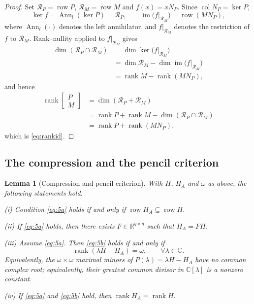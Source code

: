 \documentclass[journal]{IEEEtran}
\theoremstyle{plainn}
\newtheorem{lem}[thm]{Lemma}
\theoremstyle{remark}
\begin{document}
\begin{proof}
Set $\mathcal R_P=\operatorname{row}P$, $\mathcal R_M=\operatorname{row}M$ and $f(x)=xN_P$. Since $\operatorname{col}N_P=\ker P$,
\begin{equation*}
\ker f=\operatorname{Ann}_l(\ker P)=\mathcal R_P,\qquad
\operatorname{im}\bigl(f|_{\mathcal R_M}\bigr)=\operatorname{row}(MN_P),
\end{equation*}
where $\operatorname{Ann}_l(\cdot)$ denotes the left annihilator, and $f|_{\mathcal R_M}$ denotes the restriction of $f$ to $\mathcal R_M$. Rank--nullity applied to $f|_{\mathcal R_M}$ gives
\begin{equation*}
\begin{aligned}
\dim(\mathcal R_P\cap\mathcal R_M)
&=\dim\ker\bigl(f|_{\mathcal R_M}\bigr)\\
&=\dim\mathcal R_M-\dim\operatorname{im}\bigl(f|_{\mathcal R_M}\bigr)\\
&=\operatorname{rank}M-\operatorname{rank}(MN_P),
\end{aligned}
\end{equation*}
and hence
\begin{equation*}
\begin{aligned}
\operatorname{rank}\begin{bmatrix}P\\ M\end{bmatrix}
&=\dim(\mathcal R_P+\mathcal R_M)\\
&=\operatorname{rank}P+\operatorname{rank}M-\dim(\mathcal R_P\cap\mathcal R_M)\\
&=\operatorname{rank}P+\operatorname{rank}(MN_P),
\end{aligned}
\end{equation*}
which is \eqref{eq:rankid}.
\end{proof}

\subsection{The compression and the pencil criterion}\label{sec:compression}

\begin{lem}[Compression and pencil criterion]\label{lem:compression}
With $H$, $H_A$ and $\omega$ as above, the following statements hold.

(i) Condition \eqref{eq:5a} holds if and only if $\operatorname{row}H_A\subseteq\operatorname{row}H$.

(ii) If \eqref{eq:5a} holds, then there exists $F\in\mathbb R^{q\times q}$ such that $H_A=FH$.

(iii) Assume \eqref{eq:5a}. Then \eqref{eq:5b} holds if and only if
\begin{equation*}
\operatorname{rank}(\lambda H-H_A)=\omega,\qquad \forall\lambda\in\mathbb C .
\end{equation*}
Equivalently, the $\omega\times\omega$ maximal minors of $P(\lambda)=\lambda H-H_A$ have no common complex root; equivalently, their greatest common divisor in $\mathbb C[\lambda]$ is a nonzero constant.

(iv) If \eqref{eq:5a} and \eqref{eq:5b} hold, then $\operatorname{rank}H_A=\operatorname{rank}H$.
\end{lem}
\end{document}
